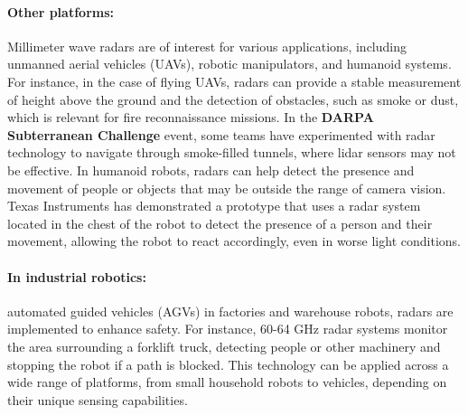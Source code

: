 \paragraph{Other platforms:} Millimeter wave radars are of interest for various applications, including unmanned aerial vehicles (UAVs), robotic manipulators, and humanoid systems. For instance, in the case of flying UAVs, radars can provide a stable measurement of height above the ground and the detection of obstacles, such as smoke or dust, which is relevant for fire reconnaissance missions. In the \textbf{DARPA Subterranean Challenge} event, some teams have experimented with radar technology to navigate through smoke-filled tunnels, where lidar sensors may not be effective. \citep{10461097}
In humanoid robots, radars can help detect the presence and movement of people or objects that may be outside the range of camera vision. Texas Instruments has demonstrated a prototype that uses a radar system located in the chest of the robot to detect the presence of a person and their movement, allowing the robot to react accordingly, even in worse light conditions.\citep{TI_SWRA831_2024}
\paragraph{In industrial robotics:} automated guided vehicles (AGVs) in factories and warehouse robots, radars are implemented to enhance safety. For instance, 60-64 GHz radar systems monitor the area surrounding a forklift truck, detecting people or other machinery and stopping the robot if a path is blocked.\citep{TI_RadarToolbox_Latest}
This technology can be applied across a wide range of platforms, from small household robots to vehicles, depending on their unique sensing capabilities.









